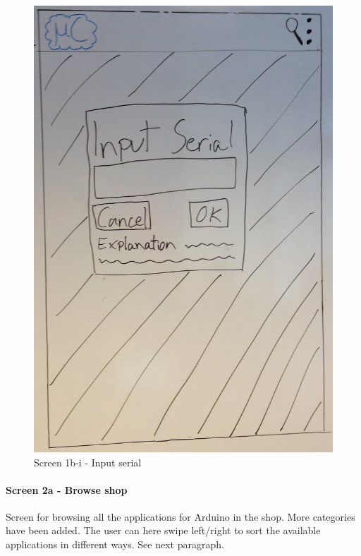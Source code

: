 \begin{figure}[H]
\centering
\includegraphics[scale=0.2]{images/Design_guide/Screen1b-i.png}
\caption{Screen 1b-i - Input serial}
\end{figure}


\paragraph{Screen 2a - Browse shop}
Screen for browsing all the applications for Arduino in the shop. More categories have been added. The user can here swipe left/right to sort the available applications in different ways. See next paragraph.

